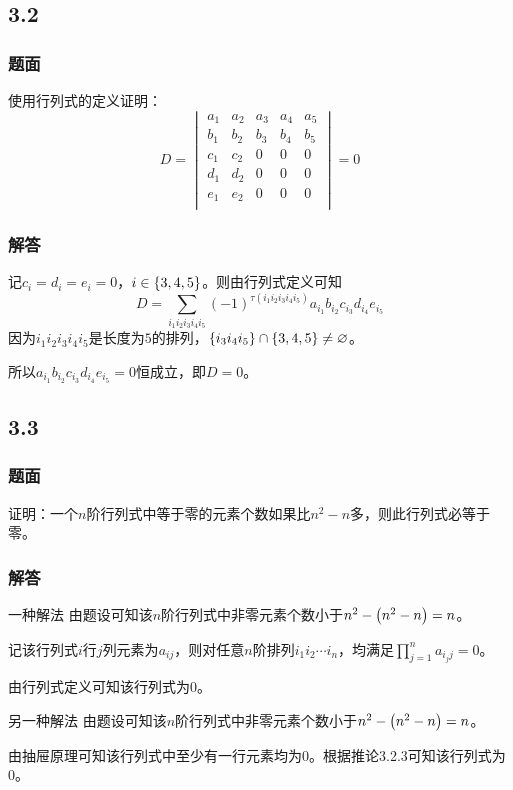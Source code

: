 \documentclass[10pt,xcolor=svgnames]{beamer} %
\begin{document}
\subsection*{3.2}
\begin{frame}
    \frametitle{题面}
    使用行列式的定义证明：
    \begin{equation*}
        D=
        \begin{vmatrix}
            a_1 & a_2 & a_3 & a_4 & a_5 \\
            b_1 & b_2 & b_3 & b_4 & b_5 \\
            c_1 & c_2 & 0   & 0   & 0   \\
            d_1 & d_2 & 0   & 0   & 0   \\
            e_1 & e_2 & 0   & 0   & 0   \\
        \end{vmatrix}=0
    \end{equation*}
\end{frame}
\begin{frame}
    \frametitle{解答}
    记\(c_i=d_i=e_i=0\)，\(i\in\left\{3,4,5 \right\}\)。则由行列式定义可知
    \begin{equation*}
        D=\sum_{i_1i_2i_3i_4i_5}(-1)^{\tau(i_1i_2i_3i_4i_5)}a_{i_1}b_{i_2}c_{i_3}d_{i_4}e_{i_5}
    \end{equation*}
    因为\(i_1i_2i_3i_4i_5\)是长度为\(5\)的排列，\(\left\{i_3i_4i_5 \right\}\cap\left\{3,4,5 \right\}\neq\varnothing\)。

    所以\(a_{i_1}b_{i_2}c_{i_3}d_{i_4}e_{i_5}=0\)恒成立，即\(D=0\)。
\end{frame}

\subsection*{3.3}
\begin{frame}
    \frametitle{题面}
    证明：一个\(n\)阶行列式中等于零的元素个数如果比\(n^2-n\)多，则此行列式必等于零。
\end{frame}
\begin{frame}
    \frametitle{解答}
    \begin{block}{一种解法}
        由题设可知该\(n\)阶行列式中非零元素个数小于\(n^2-\left( n^2-n \right)=n\)。

        记该行列式\(i\)行\(j\)列元素为\(a_{ij}\)，则对任意\(n\)阶排列\(i_1i_2\cdots i_n\)，均满足\(\prod_{j=1}^{n}a_{i_jj}=0\)。

        由行列式定义可知该行列式为\(0\)。
    \end{block}
    \pause
    \begin{block}{另一种解法}
        由题设可知该\(n\)阶行列式中非零元素个数小于\(n^2-\left( n^2-n \right)=n\)。

        由抽屉原理可知该行列式中至少有一行元素均为\(0\)。根据推论3.2.3可知该行列式为\(0\)。
    \end{block}
\end{frame}
\end{document}
